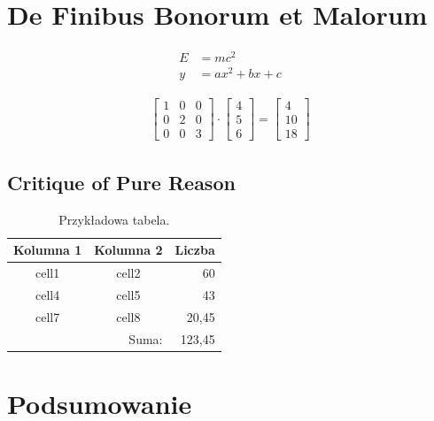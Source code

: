 \documentclass{eiti/eiti-mgr}
\begin{document}
\section{De Finibus Bonorum et Malorum}
\lipsum[1-2]

\begin{align*}
	E & = mc^2 \\ 
	y & = ax^2 + bx + c
\end{align*}

\lipsum[3]

\begin{align}
\begin{bmatrix}
1 & 0 & 0 \\ 
0 & 2 & 0 \\ 
0 & 0 & 3
\end{bmatrix} \cdot 
\begin{bmatrix}
4 \\ 5 \\ 6
\end{bmatrix} = 
\begin{bmatrix}
4 \\ 10 \\ 18
\end{bmatrix}
\end{align}

\lipsum[4] \cite{goossens93}

\subsection{Critique of Pure Reason}
\kant[1]
\begin{table} \label{tab:tabela1} \centering
\begin{tabular} {| c | c | r |} \hline
	Kolumna 1 & Kolumna 2 & Liczba \\ \hline\hline
	cell1 & cell2 & 60 \\ \hline
	cell4 & cell5 & 43 \\ \hline
	cell7 & cell8 & 20,45 \\ \hline
	\multicolumn{2}{|r|}{Suma:} & 123,45 \\ \hline
\end{tabular} \caption{Przykładowa tabela.}
\end{table}
\kant[2-3]

\section{Podsumowanie}
\lipsum[5-8]

\newpage



\newpage
\listoffigures
\newpage
\listoftables
\end{document}
